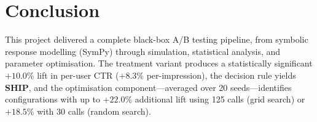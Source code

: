 \documentclass[a4paper,12pt]{extarticle}
\numberwithin{equation}{section}
\begin{document}
\clearpage

\section*{Conclusion}

This project delivered a complete black-box A/B testing pipeline, from
symbolic response modelling (SymPy) through simulation, statistical
analysis, and parameter optimisation. The treatment variant produces a
statistically significant $+10.0\%$ lift in per-user CTR ($+8.3\%$
per-impression), the decision rule yields \textbf{SHIP}, and the
optimisation component---averaged over 20 seeds---identifies configurations
with up to $+22.0\%$ additional lift using 125 calls (grid search) or
$+18.5\%$ with 30 calls (random search).

\clearpage

\printbibliography
\end{document}
